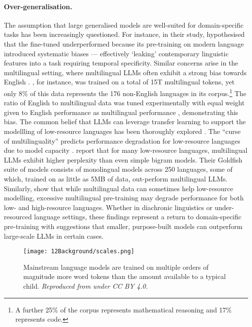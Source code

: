 \paragraph{Over-generalisation.} The assumption that large generalised models are well-suited for domain-specific tasks has been increasingly questioned. For instance, in their study, \citet{fittschen2025pretraininglanguagemodelsdiachronic} hypothesised that the fine-tuned  underperformed because its pre-training on modern language introduced systematic biases --- effectively `leaking' contemporary linguistic features into a task requiring temporal specificity. Similar concerns arise in the multilingual setting, where multilingual LLMs often exhibit a strong bias towards English \citep{wendler-etal-2024-llamas}. , for instance, was trained on a total of 15T multilingual tokens, yet only 8\% of this data represents the 176 non-English languages in its corpus.\footnote{A further 25\% of the corpus represents mathematical reasoning and 17\% represents code.} The ratio of English to multilingual data was tuned experimentally with equal weight given to English performance as multilingual performance \citep{grattafiori2024llama}, demonstrating this bias. The common belief that LLMs can leverage transfer learning to support the modellling of low-resource languages has been thoroughly explored \citep{wu-dredze-2019-beto}. The ``curse of multilinguality'' predicts performance degradation for low-resource languages due to model capacity \citep{conneau2020unsupervised}. \citet{chang2024goldfish} report that for many low-resource languages, multilingual LLMs exhibit higher perplexity than even simple bigram models. Their Goldfish suite of models consists of monolingual models across 250 languages, some of which, trained on as little as 5MB of data, out-perform multilingual LLMs. Similarly, \citet{chang2024multilinguality} show that while multilingual data can sometimes help low-resource modelling, excessive multilingual pre-training may degrade performance for both low- and high-resource languages. Whether in diachronic linguistics or under-resourced language settings, these findings represent a return to domain-specific pre-training with suggestions that smaller, purpose-built models can outperform large-scale LLMs in certain cases.

\begin{figure}
    \centering
    \texttt{[image: 12Background/scales.png]}
    \caption{Mainstream language models are trained on multiple orders of magnitude more word tokens than the amount available to a typical child. \emph{Reproduced from \citet{wilcox2025bigger} under CC BY 4.0.}}
    \label{fig:12-scales}
\end{figure}

